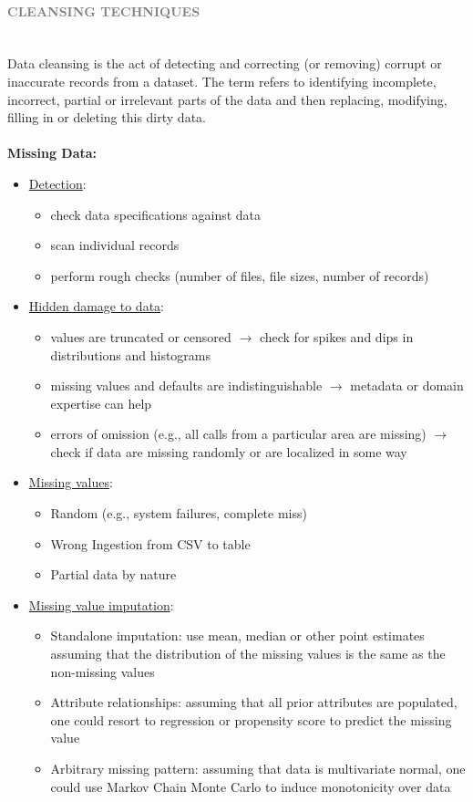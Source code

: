 \documentclass[10pt,a4paper]{article}
\newcommand{\nline}{\\~\\}
\newcommand{\myparagraph}[1]{\paragraph{\normalsize{\textcolor{gray}{\uppercase{\textbf{#1}}}} }\mbox{} \vspace{0.5em}\\}
\begin{document}
\myparagraph{Cleansing Techniques}
Data cleansing is the act of detecting and correcting (or removing) corrupt or inaccurate records from a dataset. The term refers to identifying incomplete, incorrect, partial or irrelevant parts of the data and then replacing, modifying, filling in or deleting this dirty data.
\nline
\textbf{Missing Data:}
\begin{itemize}
	\item \uline{Detection}: 
	\begin{itemize}
		\item check data specifications against data
		\item  scan individual records
		\item perform rough checks (number of files, file sizes, number of records)
	\end{itemize}
	\item \uline{Hidden damage to data}: 
	\begin{itemize}
		\item values are truncated or censored $\rightarrow$ check for spikes and dips in distributions and histograms
		\item missing values and defaults are indistinguishable $\rightarrow$ metadata or domain expertise can help
		\item errors of omission (e.g., all calls from a particular area are missing) $\rightarrow$ check if data are missing randomly or are localized in some way
	\end{itemize}
	\item \uline{Missing values}:
	\begin{itemize}
		\item Random (e.g., system failures, complete miss)
		\item Wrong Ingestion from CSV to table
		\item Partial data by nature
	\end{itemize}
	\item \uline{Missing value imputation}:
	\begin{itemize}
		\item Standalone imputation: use mean, median or other point estimates assuming that the distribution of the missing values is the same as the non-missing values
		\item Attribute relationships: assuming that all prior attributes are populated, one could resort to regression or propensity score to predict the missing value
		\item Arbitrary missing pattern: assuming that data is multivariate normal, one could use Markov Chain Monte Carlo to induce monotonicity over data

\end{itemize}
\end{itemize}
\end{document}
